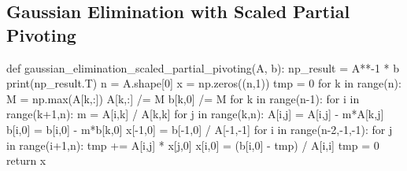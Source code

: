 \subsection{Gaussian Elimination with Scaled Partial Pivoting}
\begin{python}
def gaussian_elimination_scaled_partial_pivoting(A, b):
    np_result = A**-1 * b
    print(np_result.T)
    n = A.shape[0]
    x = np.zeros((n,1))
    tmp = 0
    for k in range(n):
        M = np.max(A[k,:])
        A[k,:] /= M
        b[k,0] /= M
    for k in range(n-1):
        for i in range(k+1,n):
            m = A[i,k] / A[k,k]
            for j in range(k,n):
                A[i,j] = A[i,j] - m*A[k,j]
            b[i,0] = b[i,0] - m*b[k,0]
    x[-1,0] = b[-1,0] / A[-1,-1]
    for i in range(n-2,-1,-1):
        for j in range(i+1,n):
            tmp += A[i,j] * x[j,0]
        x[i,0] = (b[i,0] - tmp) / A[i,i]
        tmp = 0
    return x
\end{python}